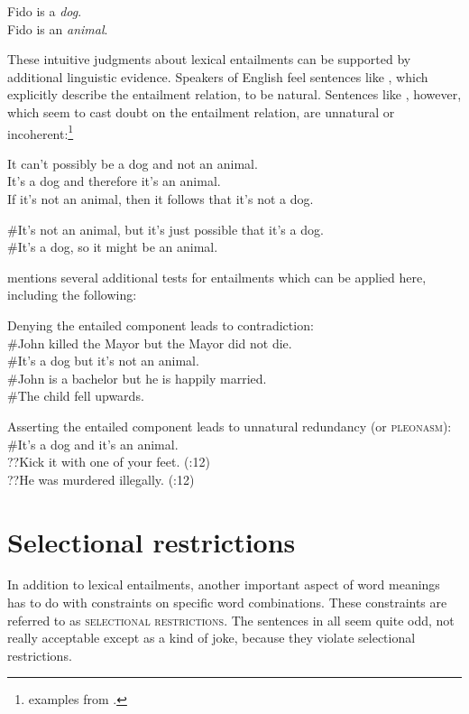 \ea \label{ex:7.4}
\ea Fido is a \textit{dog}.\\
\ex Fido is an \textit{animal}.
                       \z
\z


These intuitive judgments about lexical entailments can be supported by additional linguistic evidence. Speakers of English feel sentences like , which explicitly describe the entailment relation, to be natural. Sentences like , however, which seem to cast doubt on the entailment relation, are unnatural or incoherent:\footnote{examples from \citet[14]{Cruse1986}.}


\ea \label{ex:7.5}
\ea It can’t possibly be a dog and not an animal.\\
\ex It’s a dog and therefore it’s an animal.\\
\ex If it’s not an animal, then it follows that it’s not a dog.
                       \z
\z

\ea \label{ex:7.6}
\ea \#It’s not an animal, but it’s just possible that it’s a dog.\\
\ex \#It’s a dog, so it might be an animal.
                       \z
\z


\citet[12]{Cruse1986} mentions several additional tests for entailments which can be applied here, including the following:


\ea
Denying the entailed component leads to contradiction:\\
\ea \#John killed the Mayor but the Mayor did not die.\\
\ex \#It’s a dog but it’s not an animal.\\
\ex \#John is a bachelor but he is happily married.\\
\ex \#The child fell upwards.
\z
                       \z

\ea
Asserting the entailed component leads to unnatural redundancy (or \textsc{pleonasm}):\\
\ea \#It’s a dog and it’s an animal.\\
\ex ??Kick it with one of your feet.  (\citealt{Cruse1986}:12)\\
\ex ??He was murdered illegally.  (\citealt{Cruse1986}:12)
                       \z
\z

\section{Selectional restrictions}\label{sec:7.3}

In addition to lexical entailments, another important aspect of word meanings has to do with constraints on specific word combinations. These constraints are referred to as \textsc{selectional restrictions}. The sentences in  all seem quite odd, not really acceptable except as a kind of joke, because they violate selectional restrictions.


